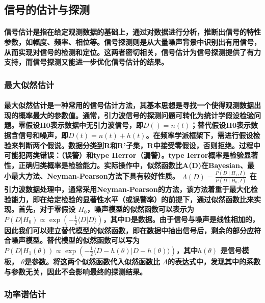 \documentclass{article}
\begin{document}
\subsection{信号的估计与探测}
\paragraph{信号估计是指在给定观测数据的基础上，通过对数据进行分析，推断出信号的特性参数，如幅度、频率、相位等。信号探测则是从大量噪声背景中识别出有用信号，从而实现对信号的检测和定位。这两者密切相关，信号估计为信号探测提供了有力支持，而信号探测又能进一步优化信号估计的结果。}
\subsubsection{最大似然估计}
\paragraph{最大似然估计是一种常用的信号估计方法，其基本思想是寻找一个使得观测数据出现的概率最大的参数值。通常，引力波信号的探测问题可转化为统计学假设检验问题。零假设H0表示数据中无引力波信号，即$D()=n(t)$；替代假设H0表示数据含信号和噪声，即$D(t)=n(t)+h(t)$。在频率学派框架下，需进行假设检验来判断两个假说。数据分类到R和R'子集，R中接受零假设，否则拒绝。过程中可能犯两类错误：（误警）和type IIerror（漏警）。type Ierror概率是检验显著性，正确归类概率是检验能力。实际操作中，似然函数比A(D)在Bayesian、最小最大方法、Neyman-Pearson方法下具有较好性质。
$\Lambda(D)=\frac{P\left(D \mid H_{1}, I\right)}{P\left(D \mid H_{0}, I\right)}$
在引力波数据处理中，通常采用Neyman-Pearson的方法，该方法着重于最大化检验能力，即在给定检验的显著性水平（或误警率）的前提下，通过似然函数比来实现。首先，对于零假设 $H_0$，噪声模型的似然函数可以表示为$P(D|H_0) \propto \exp(-\frac{1}{2} \langle D|D \rangle)$，其中D是数据。由于信号与噪声是线性相加的，因此我们可以建立替代模型的似然函数，即在数据中抽出信号后，剩余的部分应符合噪声模型。替代模型的似然函数可以写为
$P(D|H_1(\theta)) \propto \exp(-\frac{1}{2} \langle D - h(\theta)|D - h(\theta) \rangle)$，其中$h(\theta)$ 
是信号模板， $ \theta $是参数。将这两个似然函数代入似然函数比 $\Lambda$的表达式中，发现其中的系数与参数无关，因此不会影响最终的探测结果。}
\subsubsection{功率谱估计}
\end{document}
